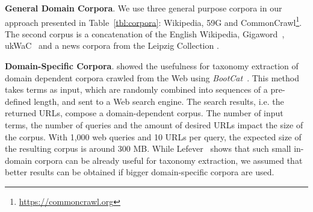 \documentclass[11pt,letterpaper]{article}
\begin{document}


\textbf{General Domain Corpora}. We use three general purpose corpora in our approach presented in Table~\ref{tbl:corpora}: Wikipedia, 59G and  CommonCrawl\footnote{\url{https://commoncrawl.org}}.  The second corpus is a concatenation of the English Wikipedia, Gigaword~\cite{parker2009english}, ukWaC~\cite{ferraresi2008introducing} and a news corpora from the Leipzig Collection \cite{Goldhahn2012b}. 

\textbf{Domain-Specific Corpora}.  showed the usefulness for taxonomy extraction of domain dependent corpora crawled from the Web using \textit{BootCat}~\cite{Baroni2004}. This method takes terms as input, which are randomly combined into sequences of a pre-defined length, and sent to a Web search engine. The search results, i.e. the returned URLs, compose a domain-dependent corpus.
%
The number of input terms, the number of queries and the amount of desired URLs impact the size of the corpus. 
With 1,000 web queries and 10 URLs per query, the expected size of the resulting corpus is around 300 MB. 
 While Lefever~ shows that such small in-domain corpora can be already useful for taxonomy extraction, we assumed that better results can be obtained if bigger domain-specific corpora are used.
 
\end{document}
